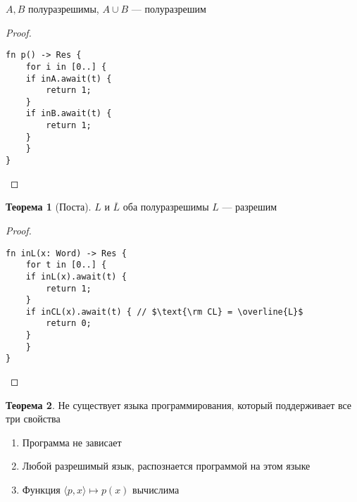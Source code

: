 \documentclass[oneside]{book}
\newcounter{propertycnt}
\theoremstyle{plain}
\newenvironment{property}{
  \renewcommand\thepropertyinner{\arabic{propertycnt}}
  \propertyinner
}{\endpropertyinner\stepcounter{propertycnt}}
\theoremstyle{remark}
\theoremstyle{definition}
\newtheorem{theorem}{Теорема}[section]
\begin{document}
\begin{property}
\(A, B\) полуразрешимы, \(A \cup B\) --- полуразрешим
\end{property}
\begin{proof}
\-
\begin{verbatim}
fn p() -> Res {
    for i in [0..] {
	if inA.await(t) {
	    return 1;
	}
	if inB.await(t) {
	    return 1;
	}
    }
}
\end{verbatim}
\end{proof}
\begin{theorem}[Поста]
\(L\) и \(\overline{L}\) оба полуразрешимы \implies \(L\) --- разрешим
\end{theorem}
\begin{proof}
\-
\begin{verbatim}
fn inL(x: Word) -> Res {
    for t in [0..] {
	if inL(x).await(t) {
	    return 1;
	}
	if inCL(x).await(t) { // $\text{\rm CL} = \overline{L}$
	    return 0;
	}
    }
}
\end{verbatim}
\end{proof}
\begin{theorem}
Не существует языка программирования, который поддерживает все три свойства
\begin{enumerate}
\item Программа не зависает
\item Любой разрешимый язык, распознается программой на этом языке
\item Функция \(\langle p, x \rangle \mapsto p(x)\) вычислима
\end{enumerate}
\end{theorem}
\end{document}
